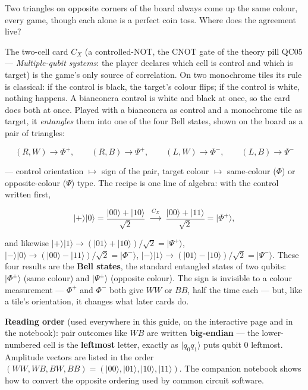 \documentclass[a4paper,11pt]{article}
\providecommand{\ket}[1]{|#1\rangle}
\begin{document}
\begin{questionbox}
Two triangles on opposite corners of the board always come up the same colour, every
game, though each alone is a perfect coin toss. Where does the agreement live?
\end{questionbox}

The two-cell card $C_X$ (a controlled-NOT, the CNOT gate of the theory pill QC05 ---
\textit{Multiple-qubit systems}: the player declares which cell is control and which
is target) is the game's only source of correlation. On two monochrome tiles its rule
is classical: if the control is black, the target's colour flips; if the control is
white, nothing happens. A bianconera control is white and black at once, so the card
does both at once. Played with a bianconera
as control and a monochrome tile as target, it \emph{entangles} them into one of the
four Bell states, shown on the board as a pair of triangles:

\begin{equation}
    (R, W) \to \Phi^+, \qquad (R, B) \to \Psi^+, \qquad
    (L, W) \to \Phi^-, \qquad (L, B) \to \Psi^-
    \label{eq:bellrecipe}
\end{equation}

\noindent --- control orientation $\mapsto$ sign of the pair, target colour $\mapsto$
same-colour ($\Phi$) or opposite-colour ($\Psi$) type. The recipe is one line of algebra:
with the control written first,

\begin{equation}
    \ket{+}\ket{0} = \frac{\ket{00} + \ket{10}}{\sqrt 2}
    \;\xrightarrow{\;C_X\;}\;
    \frac{\ket{00} + \ket{11}}{\sqrt 2} = \ket{\Phi^+},
    \label{eq:cxderiv}
\end{equation}

\noindent and likewise $\ket{+}\ket{1} \to (\ket{01} + \ket{10})/\sqrt 2 = \ket{\Psi^+}$,
$\ket{-}\ket{0} \to (\ket{00} - \ket{11})/\sqrt 2 = \ket{\Phi^-}$,
$\ket{-}\ket{1} \to (\ket{01} - \ket{10})/\sqrt 2 = \ket{\Psi^-}$. These four results
are the \textbf{Bell states}, the standard entangled states of two qubits:
$\ket{\Phi^\pm}$ (same colour) and $\ket{\Psi^\pm}$ (opposite colour). The sign is
invisible to a colour measurement --- $\Phi^+$ and $\Phi^-$ both give $WW$ or $BB$, half
the time each --- but, like a tile's orientation, it changes what later cards do.

\medskip
\noindent\textbf{Reading order} (used everywhere in this guide, on the interactive page
and in the notebook): pair outcomes like $WB$ are written \textbf{big-endian} --- the
lower-numbered cell is the \textbf{leftmost} letter, exactly as $\ket{q_0 q_1}$ puts
qubit 0 leftmost. Amplitude vectors are listed in the order
$(WW, WB, BW, BB) = (\ket{00}, \ket{01}, \ket{10}, \ket{11})$. The companion notebook
shows how to convert the opposite ordering used by common circuit software.
\end{document}
